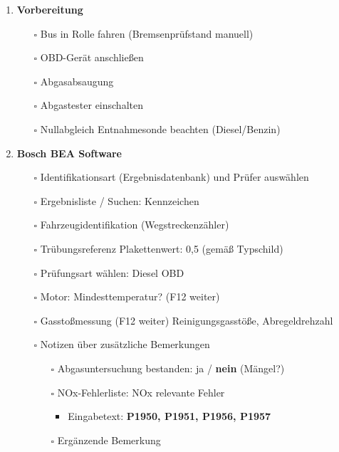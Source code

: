 \documentclass{vorlage-design-main}
\begin{document}
\begin{enumerate}
\def\labelenumi{\arabic{enumi}.}

\item
  \textbf{Vorbereitung}

  \begin{itemize}
  
  \item[$\square$]
    Bus in Rolle fahren (Bremsenprüfstand manuell)
  \item[$\square$]
    OBD-Gerät anschließen
  \item[$\square$]
    Abgasabsaugung
  \item[$\square$]
    Abgastester einschalten
  \item[$\square$]
    Nullabgleich Entnahmesonde beachten (Diesel/Benzin)
  \end{itemize}
\item
  \textbf{Bosch BEA Software}

  \begin{itemize}
  
  \item[$\square$]
    Identifikationsart (Ergebnisdatenbank) und Prüfer auswählen
  \item[$\square$]
    Ergebnisliste / Suchen: Kennzeichen
  \item[$\square$]
    Fahrzeugidentifikation (Wegstreckenzähler)
  \item[$\square$]
    Trübungsreferenz Plakettenwert: 0,5 (gemäß Typschild)
  \item[$\square$]
    Prüfungsart wählen: Diesel OBD
  \item[$\square$]
    Motor: Mindesttemperatur? (F12 weiter)
  \item[$\square$]
    Gasstoßmessung (F12 weiter) Reinigungsgasstöße, Abregeldrehzahl
  \item[$\square$]
    Notizen über zusätzliche Bemerkungen

    \begin{itemize}
    
    \item[$\square$]
      Abgasuntersuchung bestanden: ja / \textbf{nein} (Mängel?)
    \item[$\square$]
      NOx-Fehlerliste: NOx relevante Fehler

      \begin{itemize}
      
      \item
        Eingabetext: \textbf{P1950, P1951, P1956, P1957}
      \end{itemize}
    \item[$\square$]
      Ergänzende Bemerkung


\end{itemize}
\end{itemize}
\end{enumerate}
\end{document}
